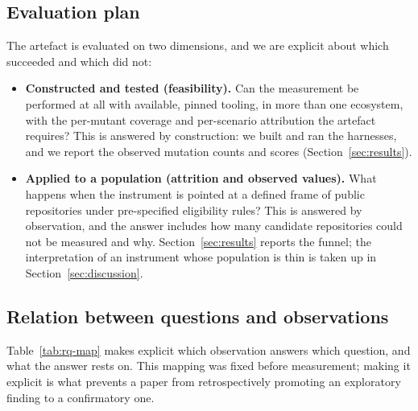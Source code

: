 \subsection{Evaluation plan}

The artefact is evaluated on two dimensions, and we are explicit about which succeeded and which did
not:

\begin{itemize}
\item \textbf{Constructed and tested (feasibility).} Can the measurement be performed at all with
      available, pinned tooling, in more than one ecosystem, with the per-mutant coverage and
      per-scenario attribution the artefact requires? This is answered by construction: we built and
      ran the harnesses, and we report the observed mutation counts and scores
      (Section~\ref{sec:results}).
\item \textbf{Applied to a population (attrition and observed values).} What happens when the
      instrument is pointed at a defined frame of public repositories under pre-specified
      eligibility rules? This is answered by observation, and the answer includes how many candidate
      repositories could not be measured and why. Section~\ref{sec:results} reports the funnel; the
      interpretation of an instrument whose population is thin is taken up in
      Section~\ref{sec:discussion}.
\end{itemize}

\subsection{Relation between questions and observations}

Table~\ref{tab:rq-map} makes explicit which observation answers which question, and what the answer
rests on. This mapping was fixed before measurement; making it explicit is what prevents a paper from
retrospectively promoting an exploratory finding to a confirmatory one.

